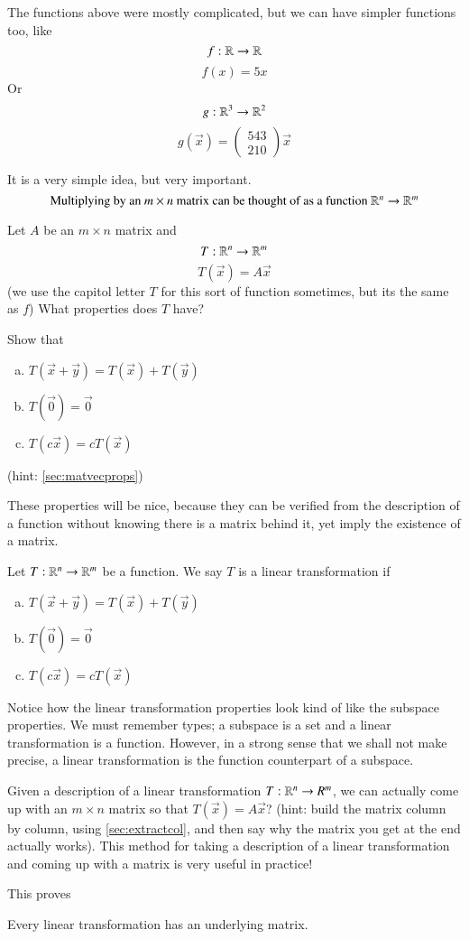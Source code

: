 The functions above were mostly complicated, but we can have simpler functions too, like
\[f: \mathbb{R}\to \mathbb{R}\]
\[f(x) = 5x\]
Or
\[g:\mathbb{R}^3\to \mathbb{R}^2\]
\[g(\vec{x}) = \left(\begin{array}{ccc} 5 4 3\\ 2 1 0\end{array}\right)\vec{x}\]

It is a very simple idea, but very important.
\[\mbox{Multiplying by an $m\times n$ matrix can be thought of as a function $\mathbb{R}^n\to \mathbb{R}^m$}\]

Let $A$ be an $m\times n$ matrix and 
\[T:\mathbb{R}^n\to \mathbb{R}^m\]
\[T(\vec{x}) = A\vec{x}\]
(we use the capitol letter $T$ for this sort of function sometimes, but its the same as $f$)
What properties does $T$ have?
\begin{EasyEx}
  Show that 
  \begin{enumerate}[a)]
  \item $T(\vec{x} + \vec{y}) = T(\vec{x}) + T(\vec{y})$
  \item $T(\vec{0}) = \vec{0}$
  \item $T(c\vec{x}) = cT(\vec{x})$
  \end{enumerate}
  (hint: \ref{sec:matvecprops})
\end{EasyEx}
These properties will be nice, because they can be verified from the description of a function without knowing there is a matrix behind it, yet imply the existence of a matrix.
\begin{Def}
  Let $T:\mathbb{R}^n\to \mathbb{R}^m$ be a function.
  We say $T$ is a linear transformation if
  \begin{enumerate}[a)]
  \item $T(\vec{x} + \vec{y}) = T(\vec{x}) + T(\vec{y})$
  \item $T(\vec{0}) = \vec{0}$
  \item $T(c\vec{x}) = cT(\vec{x})$
  \end{enumerate}
\end{Def}
\begin{ImportantRemark}
  Notice how the linear transformation properties look kind of like the subspace properties.
  We must remember types; a subspace is a set and a linear transformation is a function.
  However, in a strong sense that we shall not make precise, a linear transformation is the function counterpart of a subspace.
\end{ImportantRemark}
\begin{ImpEx}
  \label{sec:findmatrix}
  Given a description of a linear transformation $T:\mathbb{R}^n\to R^m$, we can actually come up with an $m\times n$ matrix so that $T(\vec{x}) = A\vec{x}$?
  (hint: build the matrix column by column, using \ref{sec:extractcol}, and then say why the matrix you get at the end actually works).
  This method for taking a description of a linear transformation and coming up with a matrix is very useful in practice!
\end{ImpEx}
This proves
\begin{Theorem}
  Every linear transformation has an underlying matrix.  
\end{Theorem}

